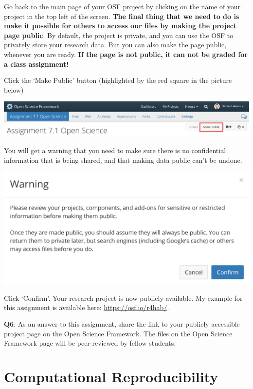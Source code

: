 \documentclass[
  oneside]{book}
\begin{document}
Go back to the main page of your OSF project by clicking on the name of your project in the top left of the screen. \textbf{The final thing that we need to do is make it possible for others to access our files by making the project page public}. By default, the project is private, and you can use the OSF to privately store your research data. But you can also make the page public, whenever you are ready. \textbf{If the page is not public, it can not be graded for a class assignment!}

Click the `Make Public' button (highlighted by the red square in the picture below)

\begin{center}\includegraphics[width=1\linewidth]{images/791bc1160787ae06a961761fb260b687} \end{center}

You will get a warning that you need to make sure there is no confidential information that is being shared, and that making data public can't be undone.

\begin{center}\includegraphics[width=1\linewidth]{images/ae3d492ab7249bafc5969ba8345d58ca} \end{center}

Click `Confirm'. Your research project is now publicly available. My example for this assignment is available here: \url{https://osf.io/r4hab/}.

\textbf{Q6}: As an answer to this assignment, share the link to your publicly accessible project page on the Open Science Framework. The files on the Open Science Framework page will be peer-reviewed by fellow students.

\hypertarget{computationalreproducibility}{%
\chapter{Computational Reproducibility}\label{computationalreproducibility}}
\end{document}
